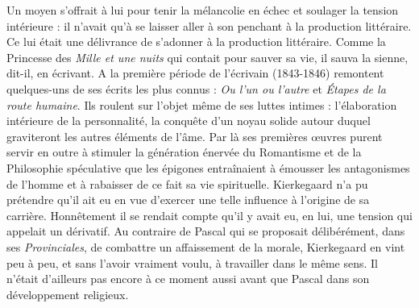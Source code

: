 \documentclass[12pt,a4paper]{article}
\begin{document}
Un moyen s'offrait à lui pour tenir la mélancolie en échec et soulager
la tension intérieure : il n'avait qu'à se laisser aller à son
penchant à la production littéraire. Ce lui était une délivrance de
s'adonner à la production littéraire.
Comme la Princesse des \emph{Mille
et une nuits} qui contait pour sauver sa vie, il sauva la sienne,
dit-il, en écrivant. A la première période de l'écrivain (1843-1846)
remontent quelques-uns de ses écrits les plus connus : \emph{Ou l'un ou
l'autre} et \emph{Étapes de la route humaine}. Ils roulent sur l'objet
même de ses luttes intimes : l'élaboration intérieure de la personnalité,
la conquête d'un noyau solide autour duquel graviteront les
autres éléments de l'âme. Par là ses premières œuvres purent servir
en outre à stimuler la génération énervée du Romantisme et de
la Philosophie spéculative que les épigones entraînaient à émousser
les antagonismes de l'homme et à rabaisser de ce fait sa vie spirituelle.
Kierkegaard n'a pu prétendre qu'il ait eu en vue d'exercer
une telle influence à l'origine de sa carrière. Honnêtement il se rendait
compte qu'il y avait eu, en lui, une tension qui appelait un
dérivatif. Au contraire de Pascal qui se proposait délibérément,
dans ses \emph{Provinciales}, de combattre un affaissement de la morale,
Kierkegaard en vint peu à peu, et sans l'avoir vraiment voulu, à
travailler dans le même sens. Il n'était d'ailleurs pas encore à ce
moment aussi avant que Pascal dans son développement religieux.
\end{document}
